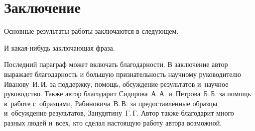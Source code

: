 \chapter*{Заключение}                       %


Основные результаты работы заключаются в следующем.

И какая-нибудь заключающая фраза.

Последний параграф может включать благодарности.  В заключение автор
выражает благодарность и большую признательность научному руководителю
Иванову~И.\,И. за поддержку, помощь, обсуждение результатов и~научное
руководство. Также автор благодарит Сидорова~А.\,А. и~Петрова~Б.\,Б.
за помощь в~работе с~образцами, Рабиновича~В.\,В. за предоставленные
образцы и~обсуждение результатов, Занудятину~Г.\,Г. Автор также благодарит много разных людей
и~всех, кто сделал настоящую работу автора возможной.
